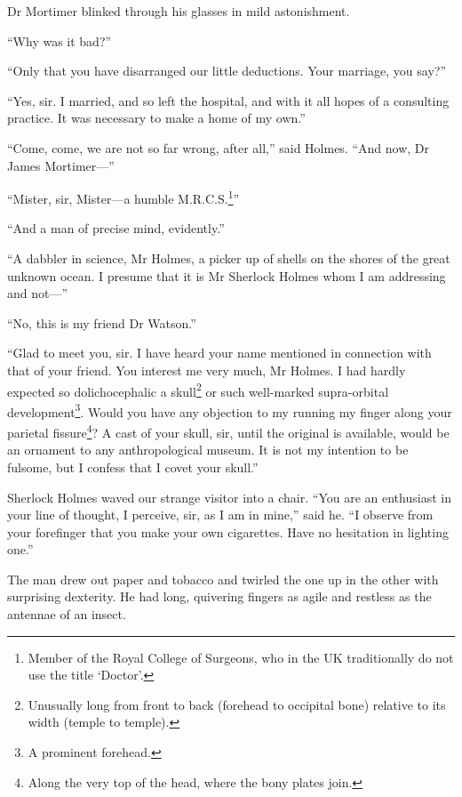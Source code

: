 \documentclass[paper=a5,BCOR=7mm,twoside,DIV=calc,12pt,usegeometry,openany,chapterprefix,endperiod,headings=big]{scrbook} %
\begin{document}
Dr Mortimer blinked through his glasses in mild astonishment.

\enquote{Why was it bad?}

\enquote{Only that you have disarranged our little deductions. Your marriage, you say?}


\enquote{Yes, sir. I married, and so left the hospital, and with it all hopes of a consulting practice. It was necessary to make a home of my own.}

\enquote{Come, come, we are not so far wrong, after all,} said Holmes. \enquote{And now, Dr James Mortimer---}

\enquote{Mister, sir, Mister---a humble M.R.C.S.\footnote{Member of the Royal College of Surgeons, who in the UK traditionally do not use the title \enquote{Doctor}.}}

\enquote{And a man of precise mind, evidently.}

\enquote{A dabbler in science, Mr Holmes, a picker up of shells on the shores of the great unknown ocean. I presume that it is Mr Sherlock Holmes whom I am addressing and not---}

\enquote{No, this is my friend Dr Watson.}

\enquote{Glad to meet you, sir. I have heard your name mentioned in connection with that of your friend. You interest me very much, Mr Holmes. I had hardly expected so dolichocephalic a skull\footnote{Unusually long from front to back (forehead to occipital bone) relative to its width (temple to temple).} or such well-marked supra-orbital development\footnote{A prominent forehead.}. Would you have any objection to my running my finger along your parietal fissure\footnote{Along the very top of the head, where the bony plates join.}? A cast of your skull, sir, until the original is available, would be an ornament to any anthropological museum. It is not my intention to be fulsome, but I confess that I covet your skull.}

Sherlock Holmes waved our strange visitor into a chair. \enquote{You are an enthusiast in your line of thought, I perceive, sir, as I am in mine,} said he. \enquote{I observe from your forefinger that you make your own cigarettes. Have no hesitation in lighting one.}

The man drew out paper and tobacco and twirled the one up in the other with surprising dexterity. He had long, quivering fingers as agile and restless as the antennae of an insect.
\end{document}
